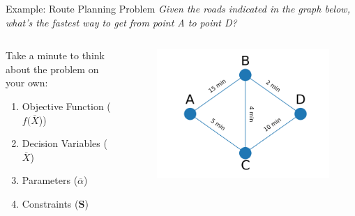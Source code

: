 \documentclass[10pt, aspectratio=169]{beamer}
\begin{document}
\begin{frame}{Example: Route Planning Problem}
    \textit{Given the roads indicated in the graph below, what's the fastest way to get from point A to point D?}

    \vspace{1.0cm}
    
    \begin{columns}
        \begin{column}{0.5\textwidth}
            Take a minute to think about the problem on your own:
            \begin{enumerate}
                \item Objective Function ($f(\overline{X}$))
                \item Decision Variables ($\overline{X}$)
                \item Parameters ($\overline{\alpha}$)
                \item Constraints ($\textbf{S}$)
            \end{enumerate}
        \end{column}
        \begin{column}{0.5\textwidth}
            \begin{figure}
                \includegraphics[width=\linewidth]{RoutePlanningProblem.png}
            \end{figure}
        \end{column}
    \end{columns}
\end{frame}
\end{document}
